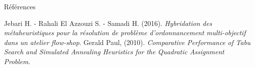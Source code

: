 \documentclass[10pt, handout]{beamer}
\begin{document}
\begin{frame}{Références}
    \begin{thebibliography}{9}
         Jebari H. - Rahali El Azzouzi S. - Samadi H. (2016). \textit{Hybridation des métaheuristiques pour la résolution de problème d’ordonnancement multi-objectif dans un atelier flow-shop}.
         Gerald Paul, (2010). \textit{Comparative Performance of Tabu Search and Simulated Annealing Heuristics for the Quadratic Assignment Problem}.
    \end{thebibliography}
\end{frame}
\end{document}
